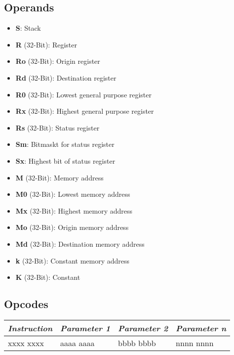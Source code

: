 \documentclass[titlepage]{scrartcl}
\begin{document}
\subsection{Operands}
\begin{itemize}
	\item \textbf{S}: Stack
	\item \textbf{R} (32-Bit): Register
	\item \textbf{Ro} (32-Bit): Origin register
	\item \textbf{Rd} (32-Bit): Destination register
	\item \textbf{R0} (32-Bit): Lowest general purpose register
	\item \textbf{Rx} (32-Bit): Highest general purpose register \vspace{1ex}
	\item \textbf{Rs} (32-Bit): Status register
	\item \textbf{Sm}: Bitmaskt for status register
	\item \textbf{Sx}: Highest bit of status register \vspace{1ex}
	\item \textbf{M} (32-Bit): Memory address
	\item \textbf{M0} (32-Bit): Lowest memory address
	\item \textbf{Mx} (32-Bit): Highest memory address
	\item \textbf{Mo} (32-Bit): Origin memory address
	\item \textbf{Md} (32-Bit): Destination memory address
	\item \textbf{k} (32-Bit): Constant memory address \vspace{1ex}
	\item \textbf{K} (32-Bit): Constant
\end{itemize}
\subsection{Opcodes}{
	\renewcommand{\arraystretch}{1.5}
	\begin{tabularx}{\textwidth}{|Y|Y|Y|Y|}
		\hline
		\itshape{Instruction} & \itshape{Parameter 1} & \itshape{Parameter 2} & \itshape{Parameter n} \\
		\hline
		xxxx xxxx             & aaaa aaaa             & bbbb bbbb             & nnnn nnnn             \\
		\hline
	\end{tabularx}
}
\newpage

\end{document}
